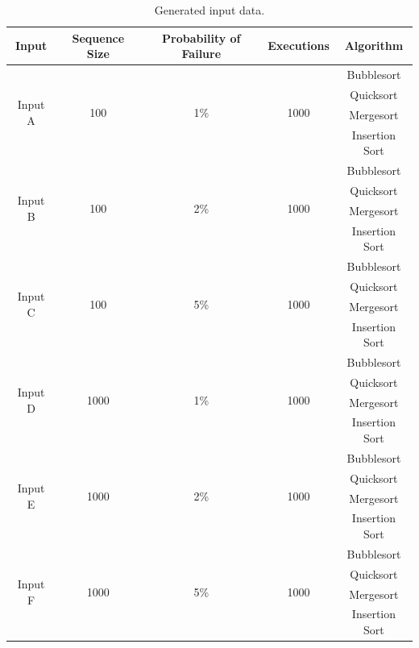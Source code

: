 \begin{table}[H]
    \caption{Generated input data.}
    \begin{center}
    \begin{tabular}{|c|c|c|c|c|}
    \hline
    \textbf{Input} & \textbf{Sequence Size} & \textbf{Probability of Failure} & \textbf{Executions} & \textbf{Algorithm} \\ 
    \hline
    \multirow{4}{*}{Input A} & \multirow{4}{*}{100} & \multirow{4}{*}{1\%} & \multirow{4}{*}{1000} & Bubblesort \\ 
    & & & & Quicksort \\
    & & & & Mergesort \\
    & & & & Insertion Sort \\
    \hline
    \multirow{4}{*}{Input B} & \multirow{4}{*}{100} & \multirow{4}{*}{2\%} & \multirow{4}{*}{1000} & Bubblesort \\ 
    & & & & Quicksort \\
    & & & & Mergesort \\
    & & & & Insertion Sort \\
    \hline
    \multirow{4}{*}{Input C} & \multirow{4}{*}{100} & \multirow{4}{*}{5\%} & \multirow{4}{*}{1000} & Bubblesort \\ 
    & & & & Quicksort \\
    & & & & Mergesort \\
    & & & & Insertion Sort \\
    \hline
    \multirow{4}{*}{Input D} & \multirow{4}{*}{1000} & \multirow{4}{*}{1\%} & \multirow{4}{*}{1000} & Bubblesort \\ 
    & & & & Quicksort \\
    & & & & Mergesort \\
    & & & & Insertion Sort \\
    \hline
    \multirow{4}{*}{Input E} & \multirow{4}{*}{1000} & \multirow{4}{*}{2\%} & \multirow{4}{*}{1000} & Bubblesort \\ 
    & & & & Quicksort \\
    & & & & Mergesort \\
    & & & & Insertion Sort \\
    \hline
    \multirow{4}{*}{Input F} & \multirow{4}{*}{1000} & \multirow{4}{*}{5\%} & \multirow{4}{*}{1000} & Bubblesort \\ 
    & & & & Quicksort \\
    & & & & Mergesort \\
    & & & & Insertion Sort \\

\end{tabular}
\end{center}
\end{table}
